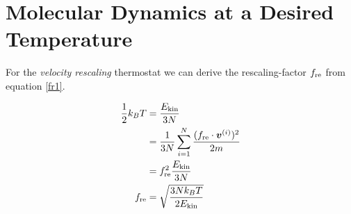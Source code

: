 \section{Molecular Dynamics at a Desired Temperature}

For the \emph{velocity rescaling} thermostat we can derive the rescaling-factor $f_\text{re}$ from equation \eqref{fr1}.

\begin{align}
\frac{1}{2}k_BT 
	&= \frac{E_\text{kin}}{3N}
	\label{fr1}\\
&= \frac{1}{3N}\sum_{i=1}^{N} \frac{(f_\text{re}\cdot\boldsymbol{v}^{(i)})^2}{2m}
	\label{fr2}\\
&= f_\text{re}^2\frac{E_\text{kin}}{3N}
	\label{fr3}\\
f_\text{re}
	&= \sqrt{\frac{3Nk_BT}{2E_\text{kin}}}
\end{align}

